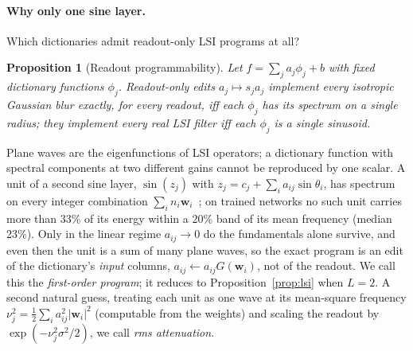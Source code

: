 \documentclass[11pt]{article}
\newtheorem{proposition}{Proposition}
\begin{document}
\paragraph{Why only one sine layer.} Which dictionaries admit readout-only LSI programs at all?
\begin{proposition}[Readout programmability]
\label{prop:char}
Let $f=\sum_j a_j\phi_j+b$ with fixed dictionary functions $\phi_j$. Readout-only edits $a_j\mapsto s_ja_j$ implement every isotropic Gaussian blur exactly, for every readout, iff each $\phi_j$ has its spectrum on a single radius; they implement every real LSI filter iff each $\phi_j$ is a single sinusoid.
\end{proposition}
Plane waves are the eigenfunctions of LSI operators; a dictionary function with spectral components at two different gains cannot be reproduced by one scalar. A unit of a second sine layer, $\sin(z_j)$ with $z_j=c_j+\sum_i a_{ij}\sin\theta_i$, has spectrum on every integer combination $\sum_i n_i\mathbf w_i$~\citep{yuce2022structured}; on trained networks no such unit carries more than 33\% of its energy within a 20\% band of its mean frequency (median 23\%). Only in the linear regime $a_{ij}\to0$ do the fundamentals alone survive, and even then the unit is a sum of many plane waves, so the exact program is an edit of the dictionary's \emph{input} columns, $a_{ij}\leftarrow a_{ij}G(\mathbf w_i)$, not of the readout. We call this the \emph{first-order program}; it reduces to Proposition~\ref{prop:lsi} when $L=2$. A second natural guess, treating each unit as one wave at its mean-square frequency $\nu_j^2=\tfrac12\sum_ia_{ij}^2|\mathbf w_i|^2$ (computable from the weights) and scaling the readout by $\exp(-\nu_j^2\sigma^2/2)$, we call \emph{rms attenuation}.
\end{document}
